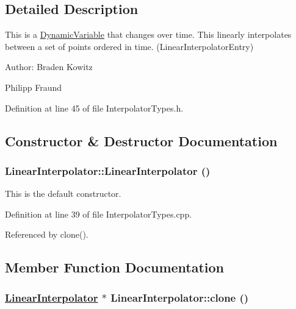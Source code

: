 \subsection{Detailed Description}
This is a \hyperlink{classDynamicVariable}{Dynamic\-Variable} that changes over time. This linearly interpolates between a set of points ordered in time. (Linear\-Interpolator\-Entry)

\begin{Desc}
\item[Author:]Braden Kowitz 

Philipp Fraund \end{Desc}




Definition at line 45 of file Interpolator\-Types.h.

\subsection{Constructor \& Destructor Documentation}
\hypertarget{classLinearInterpolator_a0}{
\subsubsection[LinearInterpolator]{\setlength{\rightskip}{0pt plus 5cm}Linear\-Interpolator::Linear\-Interpolator ()}}
\label{classLinearInterpolator_a0}


This is the default constructor. 

Definition at line 39 of file Interpolator\-Types.cpp.

Referenced by clone().

\subsection{Member Function Documentation}
\hypertarget{classLinearInterpolator_a1}{
\subsubsection[clone]{\setlength{\rightskip}{0pt plus 5cm}\hyperlink{classLinearInterpolator}{Linear\-Interpolator} $\ast$ Linear\-Interpolator::clone ()}}
\label{classLinearInterpolator_a1}


